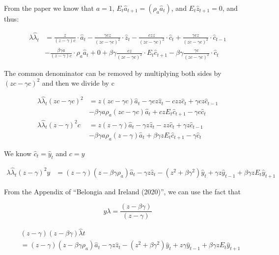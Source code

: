 \documentclass[11pt,preprint, authoryear]{elsarticle}
\numberwithin{equation}{section}
\numberwithin{figure}{section}
\numberwithin{table}{section}
\begin{document}
From the paper we know that \(a=1\),
\(E_t \hat{a}_{t+1} = (\rho_a \hat{a}_t)\), and \(E_t \hat{z}_{t+1}=0\),
and thus:

\[\begin{aligned}
\lambda \hat{\lambda}_t &= 
\frac{z}{(z  -\gamma)c} \cdot  \hat{a}_t
- \frac{ \gamma c z}{(z c- \gamma c)^{2}} \cdot \hat{z}_t 
- \frac{c z z}{(z c-\gamma c)^{2}} \cdot \hat{c}_t
+ \frac{\gamma c z }{(z c-\gamma c)^{2}} \cdot \hat{c}_{t-1} 
\\
& - \frac{\beta \gamma a}{(z-\gamma) c} \cdot \rho_a \hat{a}_t
+ 0
+ \beta \gamma \frac{c z}{(z c-\gamma c)^{2}} \cdot E_t\hat{c}_{t+1}
- \beta \gamma \frac{\gamma c }{(z c-\gamma c)^{2}} \cdot \hat{c}_t
\end{aligned}\]

The common denominator can be removed by multiplying both sides by
\((zc-\gamma c)^2\) and then we divide by c

\[\begin{aligned}
\lambda \hat{\lambda}_t (zc-\gamma c)^2 &= 
z (zc-\gamma c) \hat{a}_t
- \gamma c z \hat{z}_t 
- c z z \hat{c}_t
+ \gamma c z \hat{c}_{t-1} 
\\
& - \beta \gamma a  \rho_a (zc-\gamma c) \hat{a}_t
+ c zE_t\hat{c}_{t+1}
- \gamma c \hat{c}_t\\
\lambda \hat{\lambda}_t (z-\gamma )^2c &=
z (z-\gamma ) \hat{a}_t
- \gamma z \hat{z}_t 
-  z z \hat{c}_t
+ \gamma  z \hat{c}_{t-1} \\
& - \beta \gamma a  \rho_a (z-\gamma ) \hat{a}_t
+ \beta \gamma zE_t\hat{c}_{t+1}
- \gamma \hat{c}_t
\end{aligned}\]

We know \(\hat{c}_t = \hat{y}_t\) and \(c = y\)

\[\begin{aligned}
\lambda \hat{\lambda}_t (z-\gamma)^{2} y &=
(z-\gamma) (z-\beta \gamma \rho_a ) \hat{a}_t
-\gamma z \hat{z}_t
-\left(z^{2} + \beta \gamma^{2}\right) \hat{y}_{t}
+ \gamma z \hat{y}_{t-1}
+ \beta \gamma z E_{t} \hat{y}_{t+1}
\end{aligned}\]

From the Appendix of ``Belongia and Ireland (2020)'', we can use the
fact that

\[y \lambda=\frac{(z-\beta \gamma)}{(z-\gamma)}\]

\[\begin{aligned} &(z-\gamma)(z-\beta \gamma) \hat{\lambda}{t}\\ 
& = (z-\gamma)\left(z-\beta \gamma \rho_{a}\right) \hat{a}_{t}-\gamma z \hat{z}_{t}-\left(z^{2}+\beta \gamma^{2}\right) \hat{y}_{t}+z \gamma \hat{y}_{t-1} + \beta \gamma z E_{t} \hat{y}_{t+1}
\end{aligned}\]
\end{document}
